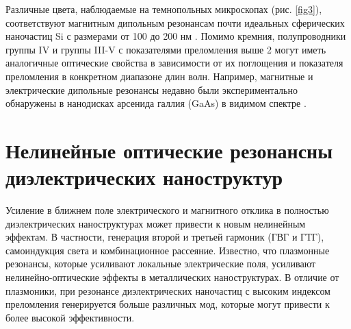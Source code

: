 \hspace*{2mm}
Различные цвета, наблюдаемые на темнопольных микроскопах (рис. \ref{fig3}), соответствуют магнитным дипольным резонансам почти идеальных сферических наночастиц Si с размерами от 100 до 200 нм \cite{kuznetsov2012luk}.  Помимо кремния, полупроводники группы IV и группы III-V с показателями преломления выше 2 могут иметь аналогичные оптические свойства в зависимости от их поглощения и показателя преломления в конкретном диапазоне длин волн. Например, магнитные и электрические дипольные резонансы недавно были экспериментально обнаружены в нанодисках арсенида галлия (GaAs) в видимом спектре \cite{person2013demonstration}.


\section{Нелинейные оптические  резонансны диэлектрических наноструктур}
\hspace*{2mm}
Усиление в ближнем поле электрического и магнитного отклика в полностью диэлектрических наноструктурах может привести к новым нелинейным эффектам. В частности, генерация второй и третьей гармоник (ГВГ и ГТГ), самоиндукция света и комбинационное рассеяние. Известно, что плазмонные резонансы, которые усиливают локальные электрические поля, усиливают нелинейно-оптические эффекты в металлических наноструктурах. В отличие от плазмоники, при резонансе диэлектрических наночастиц с высоким индексом преломления генерируется больше различных мод, которые могут привести к более высокой эффективности.


